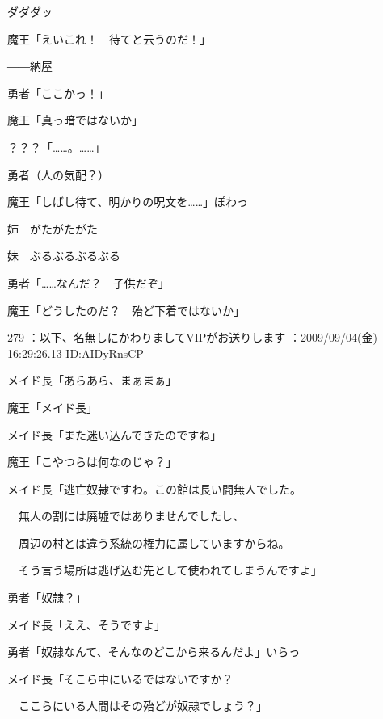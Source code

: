 \documentclass[a4j,twocolumn]{tarticle}
\begin{document}
ダダダッ 



魔王「えいこれ！　待てと云うのだ！」 




――納屋 



勇者「ここかっ！」\par{} 
魔王「真っ暗ではないか」 



？？？「……。……」 



勇者（人の気配？）\par{} 
魔王「しばし待て、明かりの呪文を……」ぽわっ 



姉　がたがたがた\par{} 
妹　ぶるぶるぶるぶる 



勇者「……なんだ？　子供だぞ」\par{} 
魔王「どうしたのだ？　殆ど下着ではないか」 

	
    
    

279 ：以下、名無しにかわりましてVIPがお送りします ：2009/09/04(金) 16:29:26.13 ID:AIDyRnsCP 


メイド長「あらあら、まぁまぁ」\par{} 
魔王「メイド長」 



メイド長「また迷い込んできたのですね」\par{} 
魔王「こやつらは何なのじゃ？」 



メイド長「逃亡奴隷ですわ。この館は長い間無人でした。\par{} 
　無人の割には廃墟ではありませんでしたし、\par{} 
　周辺の村とは違う系統の権力に属していますからね。\par{} 
　そう言う場所は逃げ込む先として使われてしまうんですよ」 



勇者「奴隷？」\par{} 
メイド長「ええ、そうですよ」 



勇者「奴隷なんて、そんなのどこから来るんだよ」いらっ 



メイド長「そこら中にいるではないですか？\par{} 
　ここらにいる人間はその殆どが奴隷でしょう？」 
\end{document}
